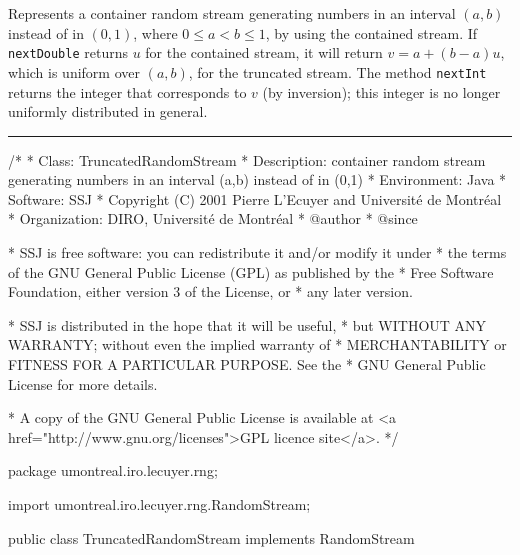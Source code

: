 
Represents a container random stream generating numbers in an interval 
$(a,b)$ instead of in $(0,1)$, where $0\le a < b \le 1$, 
by using the contained stream.
If \texttt{nextDouble} returns $u$ for the contained stream,
it will return $v = a + (b-a)u$, which is uniform over $(a,b)$,
for the truncated stream.
The method \texttt{nextInt} returns the integer that corresponds to $v$
(by inversion); this integer is no longer uniformly distributed in general.

\bigskip\hrule

\begin{code}
\begin{hide}
/*
 * Class:        TruncatedRandomStream
 * Description:  container random stream generating numbers in an interval
                 (a,b) instead of in (0,1)
 * Environment:  Java
 * Software:     SSJ 
 * Copyright (C) 2001  Pierre L'Ecuyer and Université de Montréal
 * Organization: DIRO, Université de Montréal
 * @author       
 * @since

 * SSJ is free software: you can redistribute it and/or modify it under
 * the terms of the GNU General Public License (GPL) as published by the
 * Free Software Foundation, either version 3 of the License, or
 * any later version.

 * SSJ is distributed in the hope that it will be useful,
 * but WITHOUT ANY WARRANTY; without even the implied warranty of
 * MERCHANTABILITY or FITNESS FOR A PARTICULAR PURPOSE.  See the
 * GNU General Public License for more details.

 * A copy of the GNU General Public License is available at
   <a href="http://www.gnu.org/licenses">GPL licence site</a>.
 */
\end{hide}
package umontreal.iro.lecuyer.rng;\begin{hide}

import umontreal.iro.lecuyer.rng.RandomStream;
\end{hide}

public class TruncatedRandomStream implements RandomStream\begin{hide} {
   private RandomStream stream;
   private double a;
   private double bminusa;
\end{hide}
\end{code}

